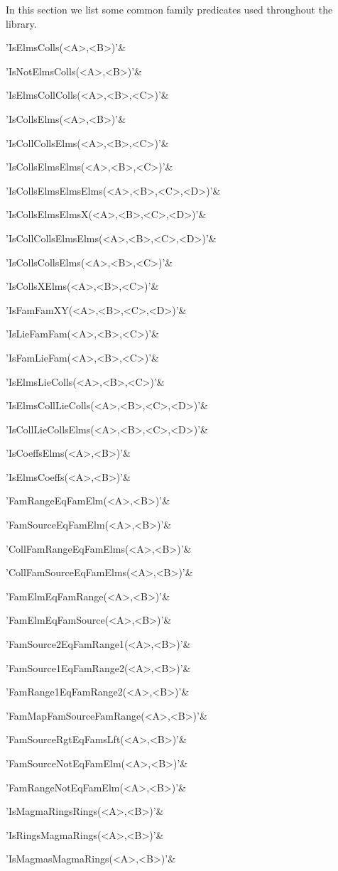 
In this section we list some common family predicates used throughout the
library.

\beginitems
'IsElmsColls(<A>,<B>)'&

'IsNotElmsColls(<A>,<B>)'&

'IsElmsCollColls(<A>,<B>,<C>)'&

'IsCollsElms(<A>,<B>)'&

'IsCollCollsElms(<A>,<B>,<C>)'&

'IsCollsElmsElms(<A>,<B>,<C>)'&

'IsCollsElmsElmsElms(<A>,<B>,<C>,<D>)'&

'IsCollsElmsElmsX(<A>,<B>,<C>,<D>)'&

'IsCollCollsElmsElms(<A>,<B>,<C>,<D>)'&

'IsCollsCollsElms(<A>,<B>,<C>)'&

'IsCollsXElms(<A>,<B>,<C>)'&

'IsFamFamXY(<A>,<B>,<C>,<D>)'&

'IsLieFamFam(<A>,<B>,<C>)'&

'IsFamLieFam(<A>,<B>,<C>)'&

'IsElmsLieColls(<A>,<B>,<C>)'&

'IsElmsCollLieColls(<A>,<B>,<C>,<D>)'&

'IsCollLieCollsElms(<A>,<B>,<C>,<D>)'&

'IsCoeffsElms(<A>,<B>)'&

'IsElmsCoeffs(<A>,<B>)'&

'FamRangeEqFamElm(<A>,<B>)'&

'FamSourceEqFamElm(<A>,<B>)'&

'CollFamRangeEqFamElms(<A>,<B>)'&

'CollFamSourceEqFamElms(<A>,<B>)'&

'FamElmEqFamRange(<A>,<B>)'&

'FamElmEqFamSource(<A>,<B>)'&

'FamSource2EqFamRange1(<A>,<B>)'&

'FamSource1EqFamRange2(<A>,<B>)'&

'FamRange1EqFamRange2(<A>,<B>)'&

'FamMapFamSourceFamRange(<A>,<B>)'&

'FamSourceRgtEqFamsLft(<A>,<B>)'&

'FamSourceNotEqFamElm(<A>,<B>)'&

'FamRangeNotEqFamElm(<A>,<B>)'&

'IsMagmaRingsRings(<A>,<B>)'&

'IsRingsMagmaRings(<A>,<B>)'&

'IsMagmasMagmaRings(<A>,<B>)'&

\enditems

